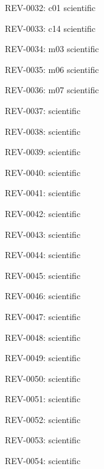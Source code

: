 \documentclass[10pt,openany]{book}
\begin{document}
\noindent REV-0032: c01 scientific\par

\noindent REV-0033: c14 scientific\par

\noindent REV-0034: m03 scientific\par

\noindent REV-0035: m06 scientific\par

\noindent REV-0036: m07 scientific\par

\noindent REV-0037:  scientific\par

\noindent REV-0038:  scientific\par

\noindent REV-0039:  scientific\par

\noindent REV-0040:  scientific\par

\noindent REV-0041:  scientific\par

\noindent REV-0042:  scientific\par

\noindent REV-0043:  scientific\par

\noindent REV-0044:  scientific\par

\noindent REV-0045:  scientific\par

\noindent REV-0046:  scientific\par

\noindent REV-0047:  scientific\par

\noindent REV-0048:  scientific\par

\noindent REV-0049:  scientific\par

\noindent REV-0050:  scientific\par

\noindent REV-0051:  scientific\par

\noindent REV-0052:  scientific\par

\noindent REV-0053:  scientific\par

\noindent REV-0054:  scientific\par
\end{document}
